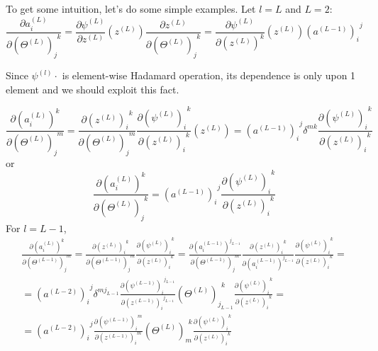 \documentclass[10pt]{amsart}
\begin{document}
\begin{multicols*}{2}
To get some intuition, let's do some simple examples.  Let $l=L$ and $L=2$:
\[
\frac{\partial a_i^{(L)} }{ \partial (\Theta^{(L)})_j^{\  \  k} } = \frac{ \partial \psi^{(L)} }{ \partial z^{(L)} }(z^{(L)} )  \frac{ \partial z^{(L)} }{ \partial (\Theta^{(L)})_j^{\  \  k} }= \frac{ \partial \psi^{(L)} }{ \partial ( z^{(L)})^k } (z^{(L)}  ) (a^{(L-1)})_i^{\  \  j} 
\]

Since $\psi^{(l)} \cdot$ is element-wise Hadamard operation, its dependence is only upon 1 element and we should exploit this fact.  

\[
\frac{\partial (a_i^{(L)})^k }{ \partial (\Theta^{(L)})_j^{\  \  m} } = \frac{ \partial (z^{(L)})_i^{\  \  k} }{ \partial (\Theta^{(L)})_j^{\  \  m} }  \frac{ \partial (\psi^{(L)})_i^{\  \  k } }{ \partial (z^{(L)})_i^{\  \  k} }(z^{(L)} )   = (a^{(L-1)})_i^{\  \  j} \delta^{mk}  \frac{ \partial (\psi^{(L)})_i^{\  \  k } }{ \partial (z^{(L)})_i^{\  \  k} }
\]
or 
\[
\frac{\partial (a_i^{(L)})^k }{ \partial (\Theta^{(L)})_j^{\  \  k} } =  (a^{(L-1)})_i^{\  \  j}   \frac{ \partial (\psi^{(L)})_i^{\  \  k } }{ \partial (z^{(L)})_i^{\  \  k} }
\]
For $l=L-1$, 
\[
\begin{gathered}
\frac{\partial (a_i^{(L)})^k }{ \partial (\Theta^{(L-1)})_j^{\  \  m} } = \frac{ \partial (z^{(L)})_i^{\  \  k} }{ \partial (\Theta^{(L-1)})_j^{\  \  m} }  \frac{ \partial (\psi^{(L)})_i^{\  \  k } }{ \partial (z^{(L)})_i^{\  \  k} }   =  \frac{\partial (a_i^{(L-1)})^{j_{L-1} }}{ \partial (\Theta^{(L-1)})_j^{\  \  m} } \frac{ \partial (z^{(L)})_i^{\  \  k} }{ \partial ( a_i^{(L-1)})^{    j_{L-1}} }     \frac{ \partial (\psi^{(L)})_i^{\  \  k } }{ \partial (z^{(L)})_i^{\  \  k} } = \\
= (a^{(L-2)})_i^{\  \  j} \delta^{m j_{L-1}}  \frac{ \partial (\psi^{(L-1)})_i^{\  \  j_{L-1} } }{ \partial (z^{(L-1)})_i^{\  \  j_{L-1}} }  (\Theta^{(L)})_{ j_{L-1}}^{\  \  k}    \frac{ \partial (\psi^{(L)})_i^{\  \  k } }{ \partial (z^{(L)})_i^{\  \  k} } = \\ 
= (a^{(L-2)})_i^{\  \  j}    \frac{ \partial (\psi^{(L-1)})_i^{\  \  m } }{ \partial (z^{(L-1)})_i^{\  \   m } }  (\Theta^{(L)})_{ m }^{\  \  k}    \frac{ \partial (\psi^{(L)})_i^{\  \  k } }{ \partial (z^{(L)})_i^{\  \  k} }
\end{gathered}
\]


\end{multicols*}
\end{document}
